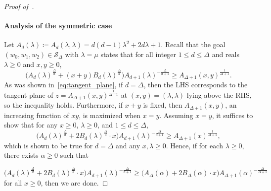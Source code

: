 \documentclass{article}
\numberwithin{equation}{section}
\theoremstyle{plain}
\theoremstyle{definition}
\theoremstyle{remark} %
\newcommand{\defeq}{\coloneqq}
\newcommand{\calS}{\mathcal{S}}
\begin{document}
\begin{proof}[Proof of~]
\paragraph{Analysis of the symmetric case}
Let \(A_d(\lambda) \defeq A_d(\lambda,\lambda) = d(d-1)\lambda^2 + 2d\lambda + 1\).
Recall that the goal \((w_0,w_1,w_2)\in\calS_\Delta\) with \(\lambda=\mu\) states that for all integer \(1\le d\le \Delta\) and reals \(\lambda\ge0\) and \(x,y\ge0\),
\[
    \bigl( A_d(\lambda)^{\frac{\Delta}{d}} + (x+y) B_d(\lambda)^{\frac{\Delta}{d}} \bigr) A_{d+1}(\lambda)^{-\frac{\Delta}{d+1}}
    \ge A_{\Delta+1}(x,y)^{\frac{1}{\Delta+1}}.
\]
As was shown in~\eqref{eq:tangent_plane}, if $d=\Delta$, then the LHS corresponds to the tangent plane of $z=A_{\Delta+1}(x,y)^{\frac{1}{\Delta+1}}$ at $(x,y)=(\lambda,\lambda)$ lying above the RHS, so the inequality holds.
Furthermore, if \(x+y\) is fixed, then \(A_{\Delta+1}(x,y)\), an increasing function of $xy$, is maximized when \(x=y\). Assuming \(x=y\), it suffices to show that for any $x\geq 0$, $\lambda\geq 0$, and $1\leq d\leq \Delta$, 
\[
    \bigl( A_d(\lambda)^{\frac{\Delta}{d}} + 2 B_d(\lambda)^{\frac{\Delta}{d}} \cdot x \bigr) A_{d+1}(\lambda)^{-\frac{\Delta}{d+1}}
    \ge A_{\Delta+1}(x)^{\frac{1}{\Delta+1}},
\]
which is shown to be true for $d=\Delta$ and any $x,\lambda\geq 0$. Hence, if for each $\lambda\geq 0$, there exists $\alpha\geq 0$ such that

\[
     \bigl( A_d(\lambda)^{\frac{\Delta}{d}} + 2 B_d(\lambda)^{\frac{\Delta}{d}} \cdot x \bigr) A_{d+1}(\lambda)^{-\frac{\Delta}{d+1}}
    \geq \big(A_\Delta(\alpha) + 2 B_\Delta(\alpha)\cdot x \big)A_{\Delta+1}(\alpha)^{-\frac{\Delta}{\Delta+1}}
\]
for all $x\geq 0$, then we are done.


\end{proof}
\end{document}
